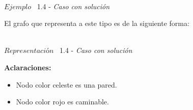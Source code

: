 \vspace*{0.3cm} \vspace*{0.3cm}
  \begin{center}
\\ {$Ejemplo$ \ 1.4 - \textit{Caso con solución}}
  \end{center}
  \vspace*{0.3cm}

El grafo que representa a este tipo es de la siguiente forma:\\

\vspace*{0.3cm} \vspace*{0.3cm}
  \begin{center}
 \\{$Representación$ \ 1.4 - \textit{Caso con solución}}
  \end{center}
  \vspace*{0.3cm}



\textbf{Aclaraciones:} 
\begin{itemize}
\item Nodo color celeste es una pared.
\item Nodo color rojo es caminable.
\end{itemize}
